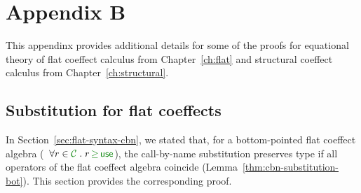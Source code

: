 
\chapter{Appendix B} 
\label{ch:appendix} 

This appendinx provides additional details for some of the proofs for equational theory
of flat coeffect calculus from Chapter~\ref{ch:flat} and structural coeffect calculus
from Chapter~\ref{ch:structural}.

\section{Substitution for flat coeffects}
\label{sec:appendix-flat-cbn}
In Section~\ref{sec:flat-syntax-cbn}, we stated that, for a bottom-pointed flat coeffect
algebra (\ie~$\forall r \in \C \;.\; r \,\cgeq\, \cunit $), the call-by-name substitution 
preserves type if all operators of the flat coeffect algebra coincide (Lemma~\ref{thm:cbn-substitution-bot}).
This section provides the corresponding proof.

